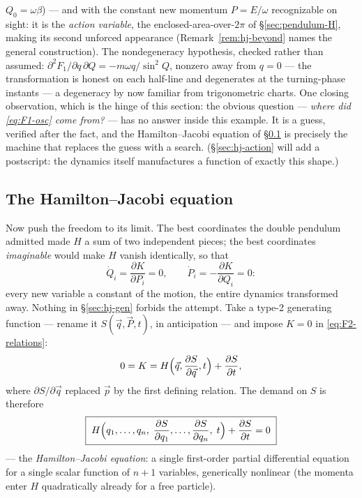 \documentclass[11pt]{article}
\theoremstyle{plain}
\theoremstyle{definition}
\theoremstyle{remark}
\newcommand{\pd}[2]{\frac{\partial #1}{\partial #2}}
\newcommand{\vq}{\vec{q}}
\newcommand{\vp}{\vec{p}}
\newcommand{\vP}{\vec{P}}
\begin{document}
$Q_0 = \omega\beta$) --- and with the constant new momentum
$P = E/\omega$ recognizable on sight: it is the \emph{action
variable}, the enclosed-area-over-$2\pi$ of
\S\ref{sec:pendulum-H}, making its second unforced appearance
(Remark~\ref{rem:hj-beyond} names the general construction). The
nondegeneracy hypothesis, checked rather than assumed:
$\partial^2 F_1/\partial q\,\partial Q = -m\omega q/\sin^2 Q$,
nonzero away from $q = 0$ --- the transformation is honest on each
half-line and degenerates at the turning-phase instants --- a
degeneracy by now familiar from trigonometric charts. One closing observation, which is
the hinge of this section: the obvious question --- \emph{where did
\eqref{eq:F1-osc} come from?} --- has no answer inside this example.
It is a guess, verified after the fact, and the Hamilton--Jacobi
equation of \S\ref{sec:hj-eq} is precisely the machine that replaces
the guess with a search. (\S\ref{sec:hj-action} will add a
postscript: the dynamics itself manufactures a function of exactly
this shape.)

\subsection{The Hamilton--Jacobi equation}
\label{sec:hj-eq}

Now push the freedom to its limit. The best coordinates the double
pendulum admitted made $H$ a sum of two independent pieces; the best
coordinates \emph{imaginable} would make $H$ vanish identically, so
that
\begin{equation}
  \dot Q_i = \pd{K}{P_i} = 0, \qquad
  \dot P_i = -\pd{K}{Q_i} = 0 :
\end{equation}
every new variable a constant of the motion, the entire dynamics
transformed away. Nothing in \S\ref{sec:hj-gen} forbids the attempt.
Take a type-2 generating function --- rename it $S(\vq, \vP, t)$, in
anticipation --- and impose $K = 0$ in \eqref{eq:F2-relations}:
\begin{equation}
  0 = K = H\Bigl(\vq, \pd{S}{\vq}, t\Bigr) + \pd{S}{t} ,
\end{equation}
where $\partial S/\partial\vq$ replaced $\vp$ by the first defining
relation. The demand on $S$ is therefore
\begin{equation}
  \boxed{\;
  H\Bigl(q_1, \dots, q_n,\;
         \pd{S}{q_1}, \dots, \pd{S}{q_n},\; t\Bigr)
  + \pd{S}{t} = 0
  \;}
  \label{eq:HJ}
\end{equation}
--- the \emph{Hamilton--Jacobi equation}: a single first-order partial
differential equation for a single scalar function of $n + 1$
variables, generically nonlinear (the momenta enter $H$ quadratically
already for a free particle).
\end{document}
